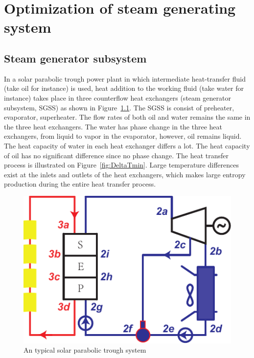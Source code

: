 \chapter{Optimization of steam generating system}
\section{Steam generator subsystem}

In a solar parabolic trough power plant in which intermediate heat-transfer fluid (take oil for instance) is used, heat addition to the working fluid (take water for instance) takes place in three counterflow heat exchangers (steam generator subsystem, SGSS) as shown in Figure~\ref{fig:PTC}. The SGSS is consist of preheater, evaporator, superheater. The flow rates of both oil and water remains the same in the three heat exchangers. 
The water has phase change in the three heat exchangers, from liquid to vapor in the evaporator, however, oil remains liquid. The heat capacity of water in each heat exchanger differs a lot. The heat capacity of oil has no significant difference since no phase change. The heat transfer process is illustrated on Figure~\ref{fig:DeltaTmin}. Large temperature differences exist at the inlets and outlets of the heat exchangers, which makes large entropy production during the entire heat transfer process.


\noindent \begin{figure}[htbp]
\begin{center}
	\includegraphics[width = 0.7\columnwidth]{fig/PTC}
	\caption{An typical solar parabolic trough system}
	\label{fig:PTC}
\end{center}
\end{figure}

